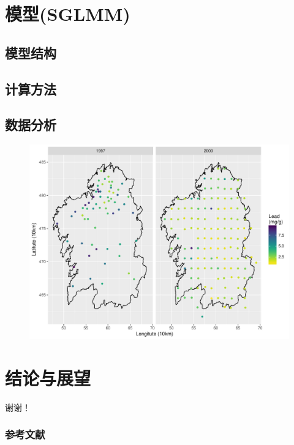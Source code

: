 \documentclass[11pt,compress,xcolor=x11names,UTF8]{beamer}
\begin{document}
\section{模型(SGLMM)}

\subsection{模型结构}

\subsection{计算方法}

\subsection{数据分析}

\begin{frame}
\begin{figure}
\centering
\includegraphics[width=.8\textwidth]{demo03}
\end{figure}
\end{frame}

\section{结论与展望}



\begin{frame}

  \centerline{\Huge\color{red} 谢谢！ }

\end{frame}



\begin{frame}[allowframebreaks]
\frametitle{参考文献}


\end{frame}
\end{document}
